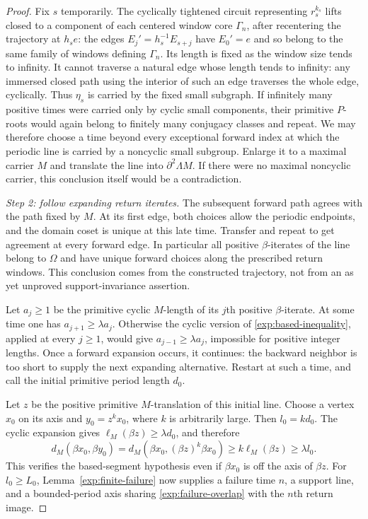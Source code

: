 \begin{proof}
Fix $s$ temporarily. The cyclically tightened circuit representing
$r_s^{k_s}$ lifts closed to
a component of each centered window core $\Gamma_n$, after
recentering the trajectory at
$h_se$: the edges $E_j'=h_s^{-1}E_{s+j}$ have $E_0'=e$ and so
belong to the same family of windows defining $\Gamma_n$. Its length is fixed as the window size tends to infinity.
It cannot traverse a natural edge whose length tends to infinity:
any immersed closed path using the interior of such an edge
traverses the whole edge, cyclically. Thus $\eta_s$ is carried by
the fixed small subgraph. If infinitely many positive times were
carried only by cyclic small components, their primitive
$P$-roots would again belong to finitely many conjugacy classes
and repeat. We may therefore choose a time beyond every
exceptional forward index at which the periodic line is carried
by a noncyclic small subgroup. Enlarge it to a maximal carrier
$M$ and translate the line into $\partial^2\Lambda M$.
If there were no maximal noncyclic carrier, this conclusion itself
would be a contradiction.

\smallskip\noindent
\emph{Step 2: follow expanding return iterates.}
The subsequent forward path agrees with the path fixed by $M$.
At its first edge, both choices allow the periodic endpoints,
and the domain coset is unique at this late time. Transfer and
repeat to get agreement at every forward edge. In particular all
positive $\beta$-iterates of the line belong to $\Omega$ and have
unique forward choices along the prescribed return windows.
This conclusion comes from the constructed trajectory, not from
an as yet unproved support-invariance assertion.

Let $a_j\ge1$ be the primitive cyclic $M$-length of its $j$th
positive $\beta$-iterate. At some time one has
$a_{j+1}\ge\lambda a_j$. Otherwise the cyclic version of
\eqref{exp:based-inequality}, applied at every $j\ge1$, would
give $a_{j-1}\ge\lambda a_j$, impossible for positive integer
lengths. Once a forward expansion occurs, it continues: the
backward neighbor is too short to supply the next expanding
alternative. Restart at such a time, and call the initial
primitive period length $d_0$.

Let $z$ be the positive primitive $M$-translation of this initial line.
Choose a vertex $x_0$ on its axis and $y_0=z^k x_0$, where $k$ is arbitrarily
large. Then $l_0=kd_0$. The cyclic expansion gives
$\ell_M(\beta z)\ge\lambda d_0$, and therefore
\[
 d_M(\beta x_0,\beta y_0)
 =d_M(\beta x_0,(\beta z)^k\beta x_0)
 \ge k\ell_M(\beta z)\ge\lambda l_0.
\]
This verifies the based-segment hypothesis even if $\beta x_0$
is off the axis of $\beta z$.
For $l_0\ge L_0$, Lemma~\ref{exp:finite-failure} now supplies a
failure time $n$, a support line, and a bounded-period axis sharing
\eqref{exp:failure-overlap} with the $n$th return image.


\end{proof}
